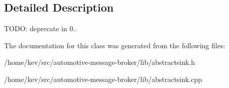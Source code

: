 \subsection{Detailed Description}
T\+O\+D\+O\+: deprecate in 0.. 

The documentation for this class was generated from the following files\+:\begin{DoxyCompactItemize}
\item 
/home/kev/src/automotive-\/message-\/broker/lib/abstractsink.\+h\item 
/home/kev/src/automotive-\/message-\/broker/lib/abstractsink.\+cpp\end{DoxyCompactItemize}
